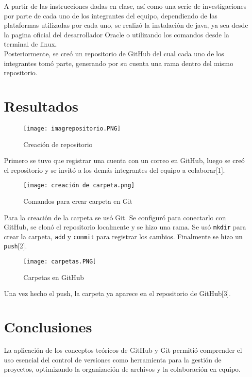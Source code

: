 \documentclass[letterpaper,12pt,oneside]{article}
\begin{document}
    A partir de las instrucciones dadas en clase, así como una serie de investigaciones por parte de cada uno de los integrantes del equipo, dependiendo de las plataformas utilizadas por cada uno, se realizó la instalación de java, ya sea desde la pagina oficial del desarrollador Oracle o utilizando los comandos desde la terminal de linux. \\

    Posteriormente, se creó un repositorio de GitHub del cual cada uno de los integrantes tomó parte, generando por su cuenta una rama dentro del mismo repositorio.
    

\section{Resultados}

\begin{figure}[h!]
    \centering
    \texttt{[image: imagrepositorio.PNG]}
    \caption{Creación de repositorio}
\end{figure}

Primero se tuvo que registrar una cuenta con un correo en GitHub, luego se creó el repositorio y se invitó a los demás integrantes del equipo a colaborar[1].

\begin{figure}[h!]
    \centering
    \texttt{[image: creación de carpeta.png]}
    \caption{Comandos para crear carpeta en Git}
\end{figure}

Para la creación de la carpeta se usó Git. Se configuró para conectarlo con GitHub, se clonó el repositorio localmente y se hizo una rama. Se usó \texttt{mkdir} para crear la carpeta, \texttt{add} y \texttt{commit} para registrar los cambios. Finalmente se hizo un \texttt{push}[2].

\begin{figure}[h!]
    \centering
    \texttt{[image: carpetas.PNG]}
    \caption{Carpetas en GitHub}
\end{figure}

Una vez hecho el push, la carpeta ya aparece en el repositorio de GitHub[3].


\section{Conclusiones}
La aplicación de los conceptos teóricos de GitHub y Git permitió comprender el uso esencial del control de versiones como herramienta para la gestión de proyectos, optimizando la organización de archivos y la colaboración en equipo.\\ 
\end{document}
